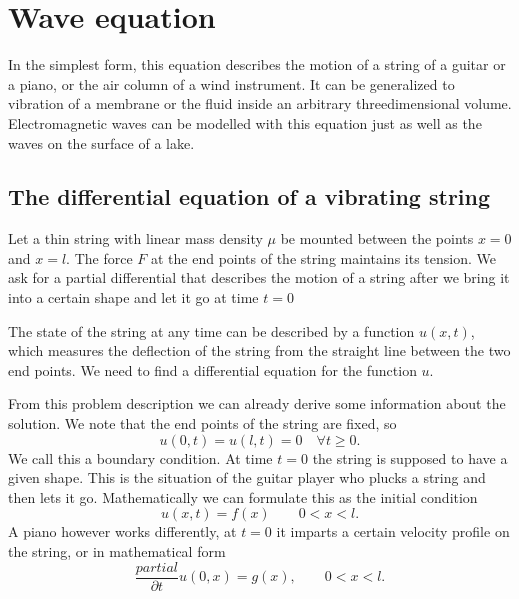 %
%
%
\section{Wave equation\label{beispiele:wellengleichung}}
In the simplest form, this equation describes the motion
of a string of a guitar or a piano, or the air column of a 
wind instrument.
It can be generalized to vibration of a membrane or the fluid inside
an arbitrary threedimensional volume.
Electromagnetic waves can be modelled with this equation just as
well as the waves on the surface of a lake.

\subsection{The differential equation of a vibrating string}
Let a thin string with linear mass density $\mu$ be mounted between
the points $x=0$ and $x=l$.
The force $F$ at the end points of the string maintains its tension.
We ask for a partial differential that describes the motion of a
string after we bring it into a certain shape and let it go at time $t=0$

The state of the string at any time can be described by a function
$u(x,t)$, which measures the deflection of the string from the straight
line between the two end points.
We need to find a differential equation for the function $u$.

From this problem description we can already derive some information
about the solution.
We note that the end points of the string are fixed, so
\[
u(0,t)=u(l,t)=0\quad\forall t\ge 0.
\]
We call this a boundary condition.
At time $t=0$ the string is supposed to have a given shape.
This is the situation of the guitar player who plucks a string and then
lets it go.
Mathematically we can formulate this as the initial condition
\[
u(x,t) = f(x)\qquad 0 < x < l.
\]
A piano however works differently, at $t=0$ it imparts a certain velocity
profile on the string, or in mathematical form
\[
\frac{partial}{\partial t}u(0,x) = g(x),\qquad 0<x<l.
\]

